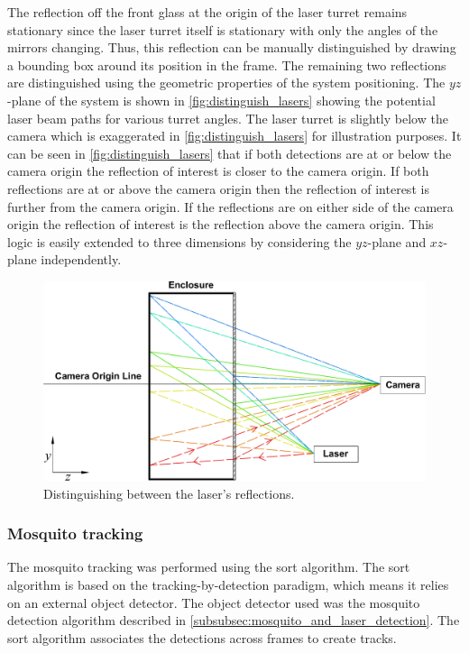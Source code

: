 The reflection off the front glass at the origin of the laser turret remains stationary since the laser turret itself is stationary with only the angles of the mirrors changing. Thus, this reflection can be manually distinguished by drawing a bounding box around its position in the frame. The remaining two reflections are distinguished using the geometric properties of the system positioning. The $yz$-plane of the system is shown in \autoref{fig:distinguish_lasers} showing the potential laser beam paths for various turret angles. The laser turret is slightly below the camera which is exaggerated in \autoref{fig:distinguish_lasers} for illustration purposes. It can be seen in \autoref{fig:distinguish_lasers} that if both detections are at or below the camera origin the reflection of interest is closer to the camera origin. If both reflections are at or above the camera origin then the  reflection of interest is further from the camera origin. If the reflections are on either side of the camera origin the reflection of interest is the reflection above the camera origin. This logic is easily extended to three dimensions by considering the $yz$-plane and $xz$-plane independently.
\begin{figure}[!htb]
  \centering
  \includegraphics[width=\textwidth]{figures/distinguish_lasers.pdf}
  \caption{Distinguishing between the laser's reflections.}
  \label{fig:distinguish_lasers}
\end{figure}



\subsubsection{Mosquito tracking}\label{subsubsec:mosquito_tracking}
The mosquito tracking was performed using the \gls{sort} algorithm. The \gls{sort} algorithm is based on the tracking-by-detection paradigm, which means it relies on an external object detector. The object detector used was the mosquito detection algorithm described in \autoref{subsubsec:mosquito_and_laser_detection}. The \gls{sort} algorithm associates the detections across frames to create tracks.


